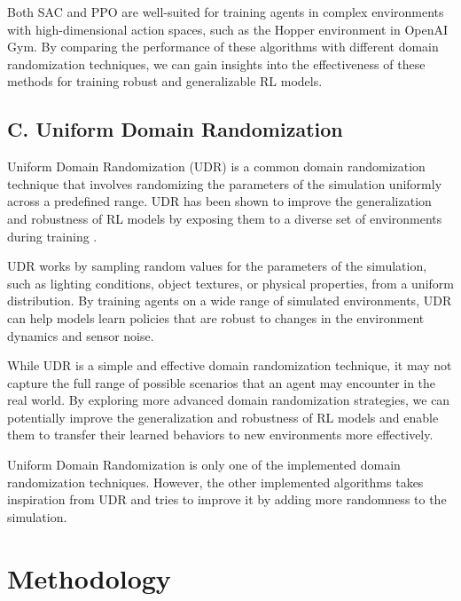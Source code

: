 \documentclass[12pt]{article}
\begin{document}
Both SAC and PPO are well-suited for training agents in complex environments with high-dimensional action spaces, such as the Hopper environment in OpenAI Gym. By comparing the performance of these algorithms with different domain randomization techniques, we can gain insights into the effectiveness of these methods for training robust and generalizable RL models.

\subsection{C. Uniform Domain Randomization}

Uniform Domain Randomization (UDR) is a common domain randomization technique that involves randomizing the parameters of the simulation uniformly across a predefined range. UDR has been shown to improve the generalization and robustness of RL models by exposing them to a diverse set of environments during training \cite{Tobin2017}.

UDR works by sampling random values for the parameters of the simulation, such as lighting conditions, object textures, or physical properties, from a uniform distribution. By training agents on a wide range of simulated environments, UDR can help models learn policies that are robust to changes in the environment dynamics and sensor noise.

While UDR is a simple and effective domain randomization technique, it may not capture the full range of possible scenarios that an agent may encounter in the real world. By exploring more advanced domain randomization strategies, we can potentially improve the generalization and robustness of RL models and enable them to transfer their learned behaviors to new environments more effectively. 

Uniform Domain Randomization is only one of the implemented domain randomization techniques. However, the other implemented algorithms takes inspiration from UDR and tries to improve it by adding more randomness to the simulation.

\section{Methodology}
\end{document}

